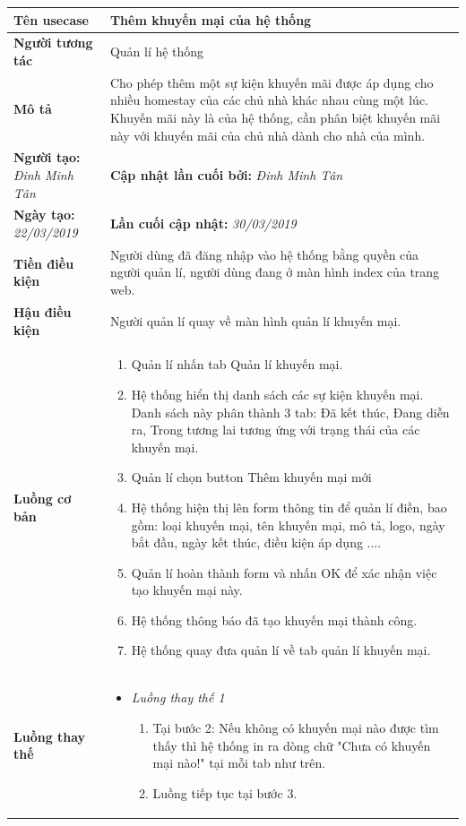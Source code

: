 \begin{center}
	\begin{longtable}{ | l |p{10cm}|}
		\hline
		\textbf{Tên usecase} & Thêm khuyến mại của hệ thống \\ \hline
		\textbf{Người tương tác} & Quản lí hệ thống \\ \hline   
		\textbf{Mô tả} & Cho phép thêm một sự kiện khuyến mãi được áp dụng cho nhiều homestay của các chủ nhà khác nhau cùng một lúc. Khuyến mãi này là của hệ thống, cần phân biệt khuyến mãi này với khuyến mãi của chủ nhà dành cho nhà của mình. \\ \hline  
		\textbf{Người tạo:} \textit{Đinh Minh Tân} & \textbf{Cập nhật lần cuối bởi:} \textit{Đinh Minh Tân} \\ \hline
		\textbf{Ngày tạo:} \textit{22/03/2019} & \textbf{Lần cuối cập nhật:} \textit{30/03/2019} \\ \hline
		\textbf{Tiền điều kiện} & Người dùng đã đăng nhập vào hệ thống bằng quyền của người quản lí, người dùng đang ở màn hình index của trang web.  \\ \hline 
		\textbf{Hậu điều kiện} & Người quản lí quay về màn hình quản lí khuyến mại. \\ \hline 
		\textbf{Luồng cơ bản} & 
		\begin{enumerate}
			\item Quản lí nhấn tab Quản lí khuyến mại.
			\item Hệ thống hiển thị danh sách các sự kiện khuyến mại. Danh sách này phân thành 3 tab: Đã kết thúc, Đang diễn ra, Trong tương lai tương ứng với trạng thái của các khuyến mại.
			\item Quản lí chọn button Thêm khuyến mại mới 
			\item Hệ thống hiện thị lên form thông tin để quản lí điền, bao gồm: loại khuyến mại, tên khuyến mại, mô tả, logo, ngày bắt đầu, ngày kết thúc, điều kiện áp dụng ....
			\item Quản lí hoàn thành form và nhấn OK để xác nhận việc tạo khuyến mại này.
			\item Hệ thống thông báo đã tạo khuyến mại thành công.
			\item Hệ thống quay đưa quản lí về tab quản lí khuyến mại.
		\end{enumerate} \\ \hline 
		\textbf{Luồng thay thế} & 
		\begin{itemize} 
			\item \textit{Luồng thay thế 1}
			\begin{enumerate}
				\item Tại bước 2: Nếu không có khuyến mại nào được tìm thấy thì hệ thống in ra dòng chữ "Chưa có khuyến mại nào!" tại mỗi tab như trên.
				\item Luồng tiếp tục tại bước 3. 
			\end{enumerate}
			

\end{itemize}
\end{longtable}
\end{center}
